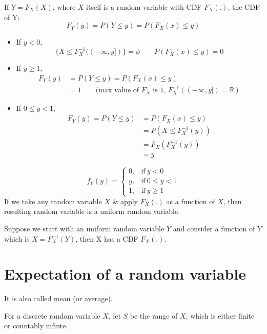 \documentclass{article}
\begin{document}
\begin{theorem}
    If $Y= F_X(X)$, where $X$ itself is a random variable with CDF $F_X(.)$, the CDF of Y:
    $$ F_Y(y)= P(Y \leq y)= P(F_X(x) \leq y)$$
\end{theorem}
    \begin{itemize}
        \item If $y<0$,
        $$ \{ X \leq F_{X}^{-1}((-\infty,y])\}= \phi \qquad P(F_{X}(x)\leq y)=0 $$
        \item If $y \geq 1$,
        \begin{align*}
            F_Y(y)&= P(Y \leq y) = P(F_X(x) \leq y) \\
            &= 1 \qquad \text{(max value of }F_X \text{ is 1, } F_{X}^{-1}((-\infty,y])= \mathbb{R})
        \end{align*}
        \item If $0 \leq y <1 $,
        \begin{align*}
            F_Y(y)= P(Y \leq y)&= P(F_X(x)\leq y) \\
            &= P(X \leq F_{X}^{-1}(y)) \\
            &= F_X(F_{X}^{-1}(y)) \\
            &= y
        \end{align*}
    \end{itemize}
    \begin{equation*}
           f_Y (y)=
            \begin{cases}
             0, & \text{if}\  y < 0 \\
             y, & \text{if}\  0 \leq y < 1 \\
             1, & \text{if}\  y \geq 1
            \end{cases}
        \end{equation*}
If we take any random variable $X$ \& apply $F_X(.)$ as a function of $X$, then resulting random variable is a uniform random variable.

Suppose we start with an uniform random variable $Y$ and consider a function of $Y$ which is $X= F_{X}^{-1}(Y)$, then X has a CDF $F_X(.)$.


\section{Expectation of a random variable}
It is also called mean (or average).

For a discrete random variable $X$, let $S$ be the range of $X$, which is either finite or countably infinte.
\end{document}
